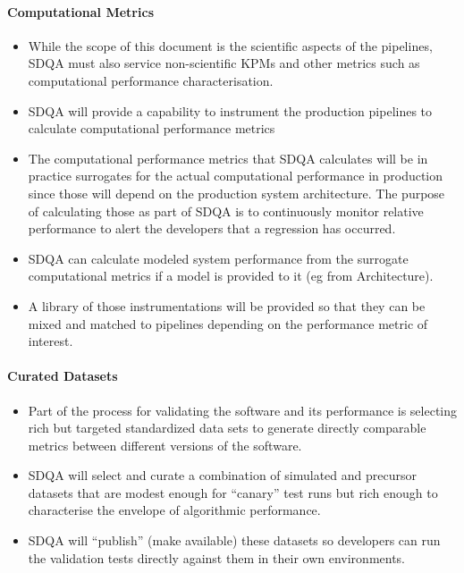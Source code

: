 \paragraph{Computational Metrics}
\label{sec:qaComputational}
\begin{itemize}

\item While the scope of this document is the scientific aspects of the pipelines, SDQA must also service non-scientific KPMs and other metrics such as computational performance characterisation.

\item SDQA will provide a capability to instrument the production pipelines to calculate computational performance metrics

\item The computational performance metrics that SDQA calculates will be in practice surrogates for the actual computational performance in production since those will depend on the production system architecture. The purpose of calculating those as part of SDQA is to continuously monitor relative performance to alert the developers that a regression has occurred.

\item SDQA can calculate modeled system performance from the surrogate computational metrics if a model is provided to it (eg from Architecture).

\item A library of those instrumentations will be provided so that they can be mixed and matched to pipelines depending on the performance metric of interest.

\end{itemize}


\paragraph{Curated Datasets}
\label{sec:qaCurateddata}
\begin{itemize}

\item Part of the process for validating the software and its performance is selecting rich but targeted standardized data sets to generate directly comparable metrics between different versions of the software.

\item SDQA will select and curate a combination of simulated and precursor datasets that are modest enough for ``canary'' test runs but rich enough to characterise the envelope of algorithmic performance.

\item SDQA will ``publish'' (make available) these datasets so developers can run the validation tests directly against them in their own environments.

\end{itemize}


